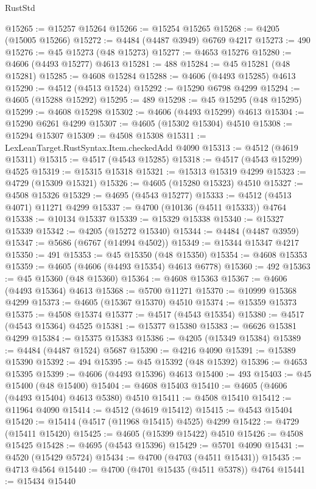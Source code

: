 \begin{lexlean}{RustStd}
\begin{coremodule}
@15265 := @15257 @15264
@15266 := @15254 @15265
@15268 := @4205 (@15005 @15266)
@15272 := @4484 (@4487 @3949) @6769 @4217
@15273 := 490
@15276 := @45 @15273 (@48 @15273)
@15277 := @4653 @15276
@15280 := @4606 (@4493 @15277) @4613
@15281 := 488
@15284 := @45 @15281 (@48 @15281)
@15285 := @4608 @15284
@15288 := @4606 (@4493 @15285) @4613
@15290 := @4512 (@4513 @1524)
@15292 := @15290 @6798 @4299
@15294 := @4605 (@15288 @15292)
@15295 := 489
@15298 := @45 @15295 (@48 @15295)
@15299 := @4608 @15298
@15302 := @4606 (@4493 @15299) @4613
@15304 := @15290 @6261 @4299
@15307 := @4605 (@15302 @15304) @4510
@15308 := @15294 @15307
@15309 := @4508 @15308
@15311 := LexLeanTarget.RustSyntax.Item.checkedAdd @4090
@15313 := @4512 (@4619 @15311)
@15315 := @4517 (@4543 @15285)
@15318 := @4517 (@4543 @15299) @4525
@15319 := @15315 @15318
@15321 := @15313 @15319 @4299
@15323 := @4729 (@15309 @15321)
@15326 := @4605 (@15280 @15323) @4510
@15327 := @4508 @15326
@15329 := @4695 (@4543 @15277)
@15333 := @4512 (@4513 @4071) @11271 @4299
@15337 := @4700 (@10136 (@4511 @15333)) @4764
@15338 := @10134 @15337
@15339 := @15329 @15338
@15340 := @15327 @15339
@15342 := @4205 (@15272 @15340)
@15344 := @4484 (@4487 @3959)
@15347 := @5686 (@6767 (@14994 @4502))
@15349 := @15344 @15347 @4217
@15350 := 491
@15353 := @45 @15350 (@48 @15350)
@15354 := @4608 @15353
@15359 := @4605 (@4606 (@4493 @15354) @4613 @6778)
@15360 := 492
@15363 := @45 @15360 (@48 @15360)
@15364 := @4608 @15363
@15367 := @4606 (@4493 @15364) @4613
@15368 := @5700 @11271
@15370 := @10999 @15368 @4299
@15373 := @4605 (@15367 @15370) @4510
@15374 := @15359 @15373
@15375 := @4508 @15374
@15377 := @4517 (@4543 @15354)
@15380 := @4517 (@4543 @15364) @4525
@15381 := @15377 @15380
@15383 := @6626 @15381 @4299
@15384 := @15375 @15383
@15386 := @4205 (@15349 @15384)
@15389 := @4484 (@4487 @1524) @5687
@15390 := @4216 @4090
@15391 := @15389 @15390
@15392 := 494
@15395 := @45 @15392 (@48 @15392)
@15396 := @4653 @15395
@15399 := @4606 (@4493 @15396) @4613
@15400 := 493
@15403 := @45 @15400 (@48 @15400)
@15404 := @4608 @15403
@15410 := @4605 (@4606 (@4493 @15404) @4613 @5380) @4510
@15411 := @4508 @15410
@15412 := @11964 @4090
@15414 := @4512 (@4619 @15412)
@15415 := @4543 @15404
@15420 := @15414 (@4517 (@11968 @15415) @4525) @4299
@15422 := @4729 (@15411 @15420)
@15425 := @4605 (@15399 @15422) @4510
@15426 := @4508 @15425
@15428 := @4695 (@4543 @15396)
@15429 := @5701 @4090
@15431 := @4520 (@15429 @5724)
@15434 := @4700 (@4703 (@4511 @15431))
@15435 := @4713 @4564
@15440 := @4700 (@4701 @15435 (@4511 @5378)) @4764
@15441 := @15434 @15440

\end{coremodule}
\end{lexlean}
